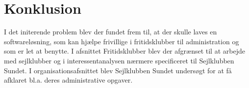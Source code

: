 \section{Konklusion}
I det initerende problem blev der fundet frem til, at der skulle laves en softwareløsning, som kan hjælpe frivillige i fritidsklubber til administration og som er let at benytte. 
I afsnittet Fritidsklubber blev der afgrænset til at arbejde med sejlklubber og i interessentanalysen nærmere specificeret til Sejlklubben Sundet. 
I organisationsafsnittet blev Sejlklubben Sundet undersøgt for at få afklaret bl.a. deres administrative opgaver. 
